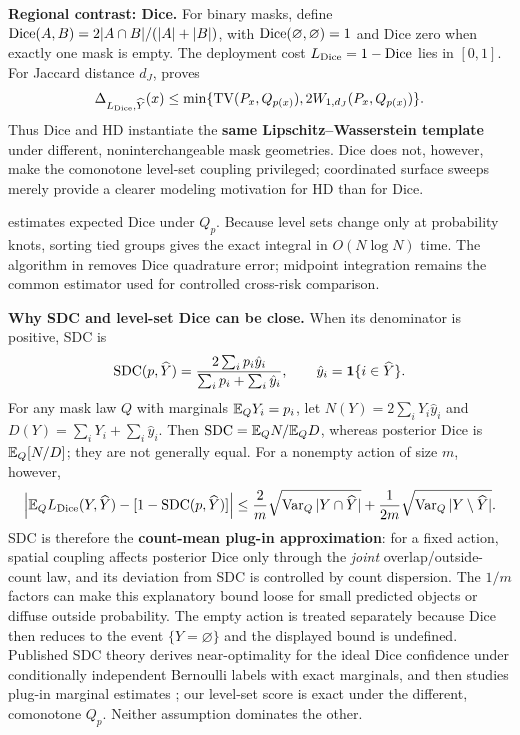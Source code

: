 \noindent\textbf{Regional contrast: Dice.}
For binary masks, define \(\operatorname{Dice}(A,B)=2|A\cap B|/(|A|+|B|)\),
with \(\operatorname{Dice}(\varnothing,\varnothing)=1\) and Dice zero when exactly one mask
is empty. The deployment cost \(L_{\operatorname{Dice}}=1-\operatorname{Dice}\) lies in \([0,1]\). For Jaccard
distance \(d_J\),  proves
\begin{equation*}
  \Delta_{L_{\operatorname{Dice}},\widehat{Y}}(x)
  \leq\min\{\operatorname{TV}(P_x,Q_{p(x)}),2W_{1,d_J}(P_x,Q_{p(x)})\}.
\end{equation*}
Thus Dice and HD instantiate the \textbf{same Lipschitz--Wasserstein template} under
different, noninterchangeable mask geometries. Dice does not, however, make the
comonotone level-set coupling privileged; coordinated surface sweeps merely
provide a clearer modeling motivation for HD than for Dice.

 estimates expected Dice under \(Q_p\). Because level
sets change only at probability knots, sorting tied groups gives the exact
integral in \(O(N\log N)\) time. The algorithm in 
removes Dice quadrature error; midpoint integration remains the common estimator
used for controlled cross-risk comparison.

\noindent\textbf{Why SDC and level-set Dice can be close.}
When its denominator is positive, SDC is
\begin{equation}
  \operatorname{SDC}(p,\widehat{Y})
  =\frac{2\sum_i p_i\hat y_i}{\sum_i p_i+\sum_i\hat y_i},
  \qquad \hat y_i=\mathbf 1\{i\in\widehat{Y}\}.
  \label{eq:sdc}
\end{equation}
For any mask law \(Q\) with marginals \(\mathbb{E}_QY_i=p_i\), let
\(N(Y)=2\sum_iY_i\hat y_i\) and
\(D(Y)=\sum_iY_i+\sum_i\hat y_i\). Then
\(\operatorname{SDC}=\mathbb{E}_QN/\mathbb{E}_QD\), whereas posterior Dice is \(\mathbb{E}_Q[N/D]\); they are
not generally equal. For a nonempty action of size \(m\), however,
\begin{equation*}
  \left|\mathbb{E}_Q L_{\operatorname{Dice}}(Y,\widehat{Y})-[1-\operatorname{SDC}(p,\widehat{Y})]\right|
  \leq \frac{2}{m}\sqrt{\operatorname{Var}_Q |Y\cap\widehat{Y}|}
       +\frac{1}{2m}\sqrt{\operatorname{Var}_Q |Y\setminus\widehat{Y}|}.
\end{equation*}
SDC is therefore the \textbf{count-mean plug-in approximation}: for a fixed
action, spatial coupling affects posterior Dice only through the
\emph{joint} overlap/outside-count law, and its deviation from SDC is
controlled by count dispersion. The \(1/m\) factors can make this explanatory
bound loose for small predicted objects or diffuse outside probability. The
empty action is treated separately because Dice then reduces to the event
\(\{Y=\varnothing\}\) and the displayed bound is undefined. Published SDC
theory derives near-optimality for the ideal Dice confidence under
conditionally independent Bernoulli labels with exact marginals, and then
studies plug-in marginal estimates \citep{sdc}; our level-set score is exact
under the different, comonotone \(Q_p\). Neither assumption dominates the
other.

